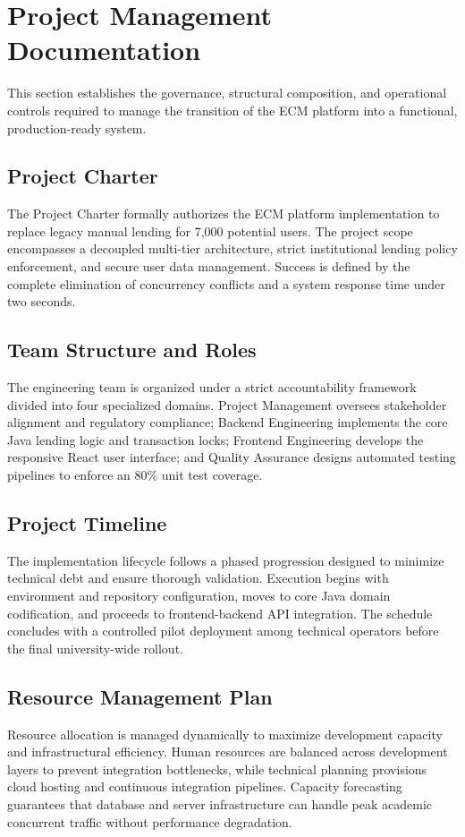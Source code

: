 \documentclass[conference]{IEEEtran}
\begin{document}
\section{Project Management Documentation}
This section establishes the governance, structural composition, and operational controls required to manage the transition of the ECM platform into a functional, production-ready system.

\subsection{Project Charter}
The Project Charter formally authorizes the ECM platform implementation to replace legacy manual lending for 7,000 potential users. The project scope encompasses a decoupled multi-tier architecture, strict institutional lending policy enforcement, and secure user data management. Success is defined by the complete elimination of concurrency conflicts and a system response time under two seconds.

\subsection{Team Structure and Roles}
The engineering team is organized under a strict accountability framework divided into four specialized domains. Project Management oversees stakeholder alignment and regulatory compliance; Backend Engineering implements the core Java lending logic and transaction locks; Frontend Engineering develops the responsive React user interface; and Quality Assurance designs automated testing pipelines to enforce an 80\% unit test coverage.

\subsection{Project Timeline}
The implementation lifecycle follows a phased progression designed to minimize technical debt and ensure thorough validation. Execution begins with environment and repository configuration, moves to core Java domain codification, and proceeds to frontend-backend API integration. The schedule concludes with a controlled pilot deployment among technical operators before the final university-wide rollout.

\subsection{Resource Management Plan}
Resource allocation is managed dynamically to maximize development capacity and infrastructural efficiency. Human resources are balanced across development layers to prevent integration bottlenecks, while technical planning provisions cloud hosting and continuous integration pipelines. Capacity forecasting guarantees that database and server infrastructure can handle peak academic concurrent traffic without performance degradation.
\end{document}

